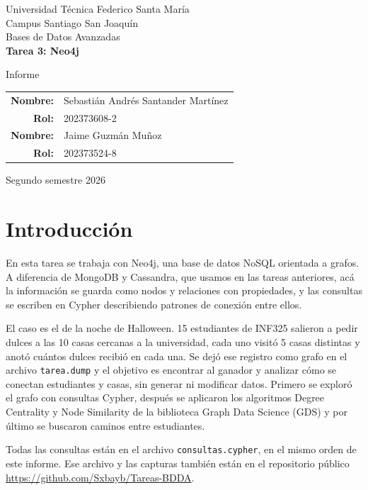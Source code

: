 \documentclass[11pt,a4paper]{article}
\begin{document}
\begin{titlepage}
	\centering
	\vspace*{1cm}
	{\Large Universidad Técnica Federico Santa María\\}
	{\large Campus Santiago San Joaquín\\[0.3em]
	Bases de Datos Avanzadas\\[3cm]}
	{\Huge\bfseries Tarea 3: Neo4j\\[1.5cm]}
	{\Large Informe\par}
	\vfill
	\begin{tabular}{rl}
		\textbf{Nombre:} & Sebastián Andrés Santander Martínez\\
		\textbf{Rol:} & 202373608-2\\[0.5em]
		\textbf{Nombre:} & Jaime Guzmán Muñoz\\
		\textbf{Rol:} & 202373524-8\\
	\end{tabular}
	\vfill
	Segundo semestre 2026
\end{titlepage}

\tableofcontents
\newpage

\section{Introducción}

En esta tarea se trabaja con Neo4j, una base de datos NoSQL orientada a grafos. A diferencia
de MongoDB y Cassandra, que usamos en las tareas anteriores, acá la información se guarda como
nodos y relaciones con propiedades, y las consultas se escriben en Cypher describiendo patrones
de conexión entre ellos.

El caso es el de la noche de Halloween. 15 estudiantes de INF325 salieron a pedir dulces a las
10 casas cercanas a la universidad, cada uno visitó 5 casas distintas y anotó cuántos dulces
recibió en cada una. Se dejó ese registro como grafo en el archivo \texttt{tarea.dump}
y el objetivo es encontrar al ganador y analizar cómo se conectan estudiantes y casas, sin
generar ni modificar datos. Primero se exploró el grafo con consultas Cypher, después se
aplicaron los algoritmos Degree Centrality y Node Similarity de la biblioteca Graph Data
Science (GDS) y por último se buscaron caminos entre estudiantes.

Todas las consultas están en el archivo \texttt{consultas.cypher}, en el mismo orden de este
informe. Ese archivo y las capturas también están en el repositorio público
\url{https://github.com/Sxbayb/Tareas-BDDA}.
\end{document}
